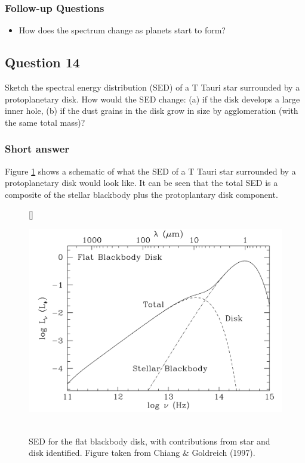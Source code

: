 \documentclass[a4paper,10pt]{article}
\begin{document}
\subsubsection{Follow-up Questions}

\begin{itemize}
    \item How does the spectrum change as planets start to form?
\end{itemize}


\newpage
\subsection{Question 14}

Sketch the spectral energy distribution (SED) of a T Tauri star surrounded by a protoplanetary disk. How would the SED change: (a) if the disk develops a large inner hole, (b) if the dust grains in the disk grow in size by agglomeration (with the same total mass)?

\subsubsection{Short answer}

Figure \ref{fig:ttsed_flat} shows a schematic of what the SED of a T Tauri star surrounded by a protoplanetary disk would look like. It can be seen that the total SED is a composite of the stellar blackbody plus the protoplantary disk component.

\begin{figure}[h]
    [\FBwidth]
    {\caption{\footnotesize{\\SED for the flat blackbody disk, with contributions from star and disk identified. Figure taken from Chiang \& Goldreich (1997).}}
    \label{fig:ttsed_flat}}
    {\includegraphics[width=12cm]{figures/TT_SED_flat.png}}
\end{figure}
\end{document}
